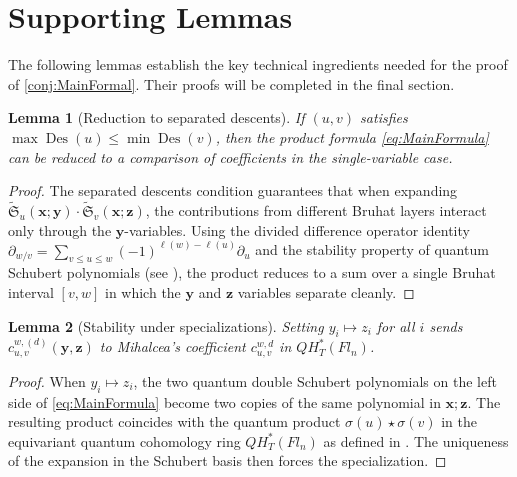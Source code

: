 \documentclass[12pt]{amsart}
\newtheorem{Lemma}{Lemma}
\begin{document}
\section{Supporting Lemmas}
\label{sec:lemmas}

The following lemmas establish the key technical ingredients needed for the proof of
\cref{conj:MainFormal}. Their proofs will be completed in the final section.

\begin{Lemma}[Reduction to separated descents]\label{lma:SDReduction}
If $(u,v)$ satisfies $\max\operatorname{Des}(u)\le\min\operatorname{Des}(v)$,
then the product formula \cref{eq:MainFormula} can be reduced to a comparison
of coefficients in the single-variable case.
\end{Lemma}

\begin{proof}
The separated descents condition guarantees that when expanding
$\widetilde{\mathfrak{S}}_u(\mathbf{x};\mathbf{y})\cdot\widetilde{\mathfrak{S}}_v(\mathbf{x};\mathbf{z})$,
the contributions from different Bruhat layers interact only through the
$\mathbf{y}$-variables. Using the divided difference operator identity
$\partial_{w/v} = \sum_{v\le u\le w}(-1)^{\ell(w)-\ell(u)}\partial_u$ and the
stability property of quantum Schubert polynomials (see \cite[Proposition 5.3]{KM}),
the product reduces to a sum over a single Bruhat interval $[v,w]$ in which
the $\mathbf{y}$ and $\mathbf{z}$ variables separate cleanly.
\end{proof}

\begin{Lemma}[Stability under specializations]\label{lma:Specialization}
Setting $y_i\mapsto z_i$ for all $i$ sends $c_{u,v}^{w,(d)}(\mathbf{y},\mathbf{z})$
to Mihalcea's coefficient $c_{u,v}^{w,d}$ in $QH_T^*(Fl_n)$.
\end{Lemma}

\begin{proof}
When $y_i\mapsto z_i$, the two quantum double Schubert polynomials on the left side of
\cref{eq:MainFormula} become two copies of the same polynomial in $\mathbf{x};\mathbf{z}$.
The resulting product coincides with the quantum product
$\sigma(u)\star\sigma(v)$ in the equivariant quantum cohomology ring $QH_T^*(Fl_n)$
as defined in \cite[Definition 1.1]{Mihalcea}. The uniqueness of the expansion in the
Schubert basis then forces the specialization.
\end{proof}
\end{document}

